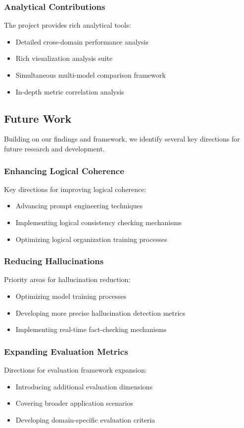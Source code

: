 \subsubsection{Analytical Contributions}
The project provides rich analytical tools:
\begin{itemize}
    \item Detailed cross-domain performance analysis
    \item Rich visualization analysis suite
    \item Simultaneous multi-model comparison framework
    \item In-depth metric correlation analysis
\end{itemize}

\subsection{Future Work}
Building on our findings and framework, we identify several key directions for future research and development.

\subsubsection{Enhancing Logical Coherence}
Key directions for improving logical coherence:
\begin{itemize}
    \item Advancing prompt engineering techniques
    \item Implementing logical consistency checking mechanisms
    \item Optimizing logical organization training processes
\end{itemize}

\subsubsection{Reducing Hallucinations}
Priority areas for hallucination reduction:
\begin{itemize}
    \item Optimizing model training processes
    \item Developing more precise hallucination detection metrics
    \item Implementing real-time fact-checking mechanisms
\end{itemize}

\subsubsection{Expanding Evaluation Metrics}
Directions for evaluation framework expansion:
\begin{itemize}
    \item Introducing additional evaluation dimensions
    \item Covering broader application scenarios
    \item Developing domain-specific evaluation criteria
\end{itemize}

